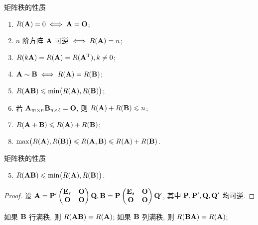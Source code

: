 \begin{frame}{矩阵秩的性质}
	\onslide<+->
	\begin{proposition}
		\begin{enumerate}
			\item $R({\mathbf{A}})=0\iff {\mathbf{A}}={\mathbf{O}}$;
			\item $n$ 阶方阵 ${\mathbf{A}}$ 可逆 $\iff R({\mathbf{A}})=n$;
			\item $R(k{\mathbf{A}})=R({\mathbf{A}})=R({\mathbf{A}}^{\mathrm{T}}), k\neq 0$;
			\item ${\mathbf{A}}\sim{\mathbf{B}}\iff R({\mathbf{A}})=R({\mathbf{B}})$;
			\item $R({\mathbf{A}}{\mathbf{B}})\leqslant \min\bigl(R({\mathbf{A}}),R({\mathbf{B}})\bigr)$;
			\item 若 ${\mathbf{A}}_{m\times n}{\mathbf{B}}_{n\times\ell}={\mathbf{O}}$, 则 $R({\mathbf{A}})+R({\mathbf{B}})\leqslant n$;
			\item $R({\mathbf{A}}+{\mathbf{B}})\leqslant R({\mathbf{A}})+R({\mathbf{B}})$;
			\item $\max\bigl(R({\mathbf{A}}),R({\mathbf{B}})\bigr)\leqslant R({\mathbf{A}},{\mathbf{B}})\leqslant R({\mathbf{A}})+R({\mathbf{B}})$.
		\end{enumerate}
	\end{proposition}
\end{frame}


\begin{frame}{矩阵秩的性质}
	\onslide<+->
	\begin{proposition}
		\begin{enumerate}
			\setcounter{enumi}{4}
			\item $R({\mathbf{A}}{\mathbf{B}})\leqslant \min\bigl(R({\mathbf{A}}),R({\mathbf{B}})\bigr)$.
		\end{enumerate}
	\end{proposition}
	\onslide<+->
	\begin{proof}
		 设 ${\mathbf{A}}={\mathbf{P}}'\begin{pmatrix}
			{\mathbf{E}}_r&{\mathbf{O}}\\{\mathbf{O}}&{\mathbf{O}}
		\end{pmatrix}{\mathbf{Q}},{\mathbf{B}}={\mathbf{P}}\begin{pmatrix}
			{\mathbf{E}}_s&{\mathbf{O}}\\{\mathbf{O}}&{\mathbf{O}}
		\end{pmatrix}{\mathbf{Q}}'$, 其中 ${\mathbf{P}},{\mathbf{P}}',{\mathbf{Q}},{\mathbf{Q}}'$ 均可逆.
		\onslide<+->{%
			因此它的秩不超过 $\min(r,s)$.
		}
	\end{proof}
	\onslide<+->
	如果 ${\mathbf{B}}$ 行满秩, 则 $R({\mathbf{A}}{\mathbf{B}})=R({\mathbf{A}})$;
	如果 ${\mathbf{B}}$ 列满秩, 则 $R({\mathbf{B}}{\mathbf{A}})=R({\mathbf{A}})$;
\end{frame}


